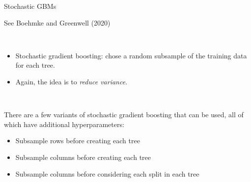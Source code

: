 \documentclass[
  10pt,
  ignorenonframetext,
]{beamer}
\providecommand{\tightlist}{%
  \setlength{\itemsep}{0pt}\setlength{\parskip}{0pt}}
\begin{document}
\begin{frame}
\begin{block}{Stochastic GBMs}
\protect\hypertarget{stochastic-gbms}{}
\scriptsize

See Boehmke and Greenwell (2020)

\(~\) \normalsize

\begin{itemize}
\tightlist
\item
  Stochastic gradient boosting: chose a random subsample of the training
  data for each tree.
\end{itemize}

\vspace{2mm}

\begin{itemize}
\tightlist
\item
  Again, the idea is to \emph{reduce variance}.
\end{itemize}

\(~\)

There are a few variants of stochastic gradient boosting that can be
used, all of which have additional hyperparameters:

\vspace{2mm}

\begin{itemize}
\tightlist
\item
  Subsample rows before creating each tree
\end{itemize}

\vspace{2mm}

\begin{itemize}
\tightlist
\item
  Subsample columns before creating each tree
\end{itemize}

\vspace{2mm}

\begin{itemize}
\tightlist
\item
  Subsample columns before considering each split in each tree
\end{itemize}
\end{block}
\end{frame}
\end{document}
